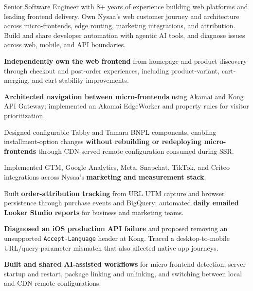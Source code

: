 \begin{cvparagraph}
Senior Software Engineer with 8+ years of experience building web platforms and leading frontend delivery. Own Nysaa's web customer journey and architecture across micro-frontends, edge routing, marketing integrations, and attribution. Build and share developer automation with agentic AI tools, and diagnose issues across web, mobile, and API boundaries.
\end{cvparagraph}

{\hfill{}\par}
\begin{resumebullets}
  \item \textbf{Independently own the web frontend} from homepage and product discovery through checkout and post-order experiences, including product-variant, cart-merging, and cart-stability improvements.
  \item \textbf{Architected navigation between micro-frontends} using Akamai and Kong API Gateway; implemented an Akamai EdgeWorker and property rules for visitor prioritization.
  \item Designed configurable Tabby and Tamara BNPL components, enabling installment-option changes \textbf{without rebuilding or redeploying micro-frontends} through CDN-served remote configuration consumed during SSR.
  \item Implemented GTM, Google Analytics, Meta, Snapchat, TikTok, and Criteo integrations across Nysaa's \textbf{marketing and measurement stack}.
  \item Built \textbf{order-attribution tracking} from URL UTM capture and browser persistence through purchase events and BigQuery; automated \textbf{daily emailed Looker Studio reports} for business and marketing teams.
  \item \textbf{Diagnosed an iOS production API failure} and proposed removing an unsupported \texttt{Accept-Language} header at Kong. Traced a desktop-to-mobile URL/query-parameter mismatch that also affected native app journeys.
  \item \textbf{Built and shared AI-assisted workflows} for micro-frontend detection, server startup and restart, package linking and unlinking, and switching between local and CDN remote configurations.
\end{resumebullets}

